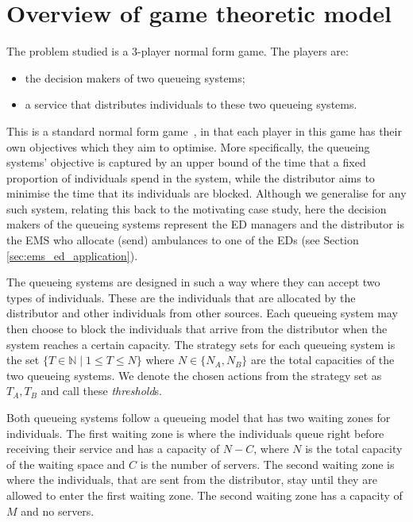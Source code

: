 \section{Overview of game theoretic model} \label{sec:model_overview}

The problem studied is a 3-player normal form game. The players are:
  
\begin{itemize}
    \item the decision makers of two queueing systems;
    \item a service that distributes individuals to these two queueing systems.
\end{itemize}

This is a standard normal form game~\cite{Maschler2013},  
in that each player in this game has their own objectives which they aim to 
optimise.
More specifically, the queueing systems' objective is captured by an upper bound
of the time that a fixed proportion of individuals spend in the system, 
while the distributor aims to minimise the time that its individuals 
are blocked.
Although we generalise for any such system, relating this back to the
motivating case study, here the decision makers of the queueing systems
represent the ED managers and the distributor is the EMS who allocate (send)
ambulances to one of the EDs (see Section \ref{sec:ems_ed_application}). 

The queueing systems are designed in such a way where they can accept two types
of individuals. 
These are the individuals that are allocated by the distributor and 
other individuals from other sources. 
Each queueing system may then choose to block the individuals that arrive from 
the distributor when the system reaches a certain capacity. 
The strategy sets for each queueing system is the set 
\( \{T \in \mathbb{N} \;|\; 1 \leq T \leq N\} \) where \(N \in\{N_A, N_B\}\) are 
the total capacities of the two queueing systems. We denote the chosen actions 
from the strategy set as \(T_A, T_B\) and call these \textit{threshold}s.

Both queueing systems follow a queueing model that has two waiting zones for 
individuals. 
The first waiting zone is where the individuals queue right before receiving 
their service and has a capacity of \( N - C \), where \(N\) is the total 
capacity of the waiting space and \(C\) is the number of servers. 
The second waiting zone is where the individuals, that are sent from the 
distributor, stay until they are allowed to enter the first waiting zone.
The second waiting zone has a capacity of \(M\) and no servers.

